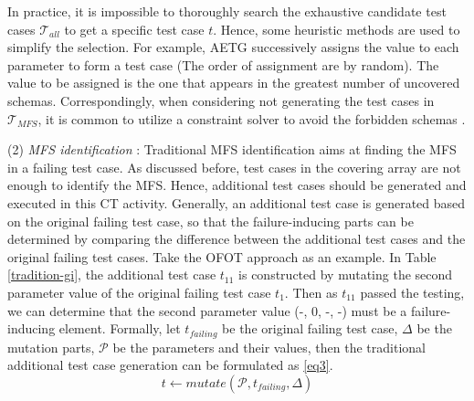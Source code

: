 \documentclass{sig-alternate}
\begin{document}
In practice, it is impossible to thoroughly search the exhaustive candidate test cases $\mathcal{T}_{all}$ to get a specific test case $t$. Hence, some heuristic methods are used to simplify the selection. For example, AETG \cite{cohen1997aetg} successively assigns the value to each parameter to form a test case (The order of assignment are by random). The value to be assigned is the one that appears in the greatest number of uncovered schemas. Correspondingly, when considering not generating the test cases in $\mathcal{T}_{MFS}$, it is common to utilize a constraint solver to avoid the forbidden schemas \cite{cohen2007interaction,cohen2008constructing}.



%
%






(2) \emph{MFS identification} : Traditional MFS identification aims at finding the MFS in a failing test case. As discussed before, test cases in the covering array are not enough to identify the MFS. Hence, additional test cases should be generated and executed in this CT activity. Generally, an additional test case is generated based on the original failing test case, so that the failure-inducing parts can be determined by comparing the difference between the additional test cases and the original failing test cases. Take the OFOT approach as an example. In Table \ref{tradition-gi}, the additional test case $t_{11}$ is constructed by mutating the second parameter value of the original failing test case $t_{1}$. Then as $t_{11}$ passed the testing, we can determine that the second parameter value (-, 0, -, -) must be a failure-inducing element. Formally, let $t_{failing}$ be the original failing test case, $\Delta$ be the mutation parts, $\mathcal{P}$ be the parameters and their values, then the traditional additional test case generation can be formulated as \ref{eq3}.
\begin{displaymath}t \leftarrow  mutate (\mathcal{P}, t_{failing}, \Delta )  \tag{EQ3} \label{eq3} \end{displaymath}
\end{document}
